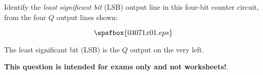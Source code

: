 

Identify the {\it least significant bit} (LSB) output line in this four-bit counter circuit, from the four $Q$ output lines shown:

$$\epsfbox{03071x01.eps}$$







The least significant bit (LSB) is the $Q$ output on the very left.







{\bf This question is intended for exams only and not worksheets!}.




